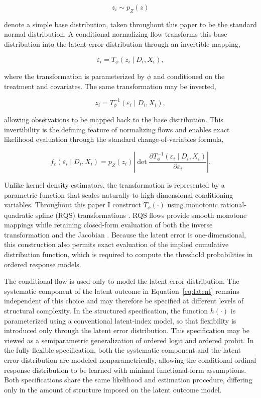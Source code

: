 \documentclass{article}
\begin{document}
\[
z_i\sim p_Z(z)
\]

denote a simple base distribution, taken throughout this paper to be the standard normal distribution. A conditional normalizing flow transforms this base distribution into the latent error distribution through an invertible mapping,

\[
\varepsilon_i = T_\phi(z_i\mid D_i,X_i),
\]

where the transformation is parameterized by $\phi$ and conditioned on the treatment and covariates. The same transformation may be inverted,

\[
z_i = T_\phi^{-1}(\varepsilon_i\mid D_i,X_i),
\]

allowing observations to be mapped back to the base distribution. This invertibility is the defining feature of normalizing flows and enables exact likelihood evaluation through the standard change-of-variables formula,

\[
f_\varepsilon(\varepsilon_i\mid D_i,X_i) = p_Z(z_i)
\left|
\det \frac{\partial T_\phi^{-1}(\varepsilon_i\mid D_i,X_i)} {\partial\varepsilon_i}
\right|.
\]

Unlike kernel density estimators, the transformation is represented by a parametric function that scales naturally to high-dimensional conditioning variables. Throughout this paper I construct $T_\phi(\cdot)$ using monotonic rational-quadratic spline (RQS) transformations \citep{Durkan2019a}. RQS flows provide smooth monotone mappings while retaining closed-form evaluation of both the inverse transformation and the Jacobian \citep{Durkan2019a}. Because the latent error is one-dimensional, this construction also permits exact evaluation of the implied cumulative distribution function, which is required to compute the threshold probabilities in ordered response models.

The conditional flow is used only to model the latent error distribution. The systematic component of the latent outcome in Equation~\eqref{eq:latent} remains independent of this choice and may therefore be specified at different levels of structural complexity. In the structured specification, the function $h(\cdot)$ is parameterized using a conventional latent-index model, so that flexibility is introduced only through the latent error distribution. This specification may be viewed as a semiparametric generalization of ordered logit and ordered probit. In the fully flexible specification, both the systematic component and the latent error distribution are modeled nonparametrically, allowing the conditional ordinal response distribution to be learned with minimal functional-form assumptions. Both specifications share the same likelihood and estimation procedure, differing only in the amount of structure imposed on the latent outcome model.
\end{document}
